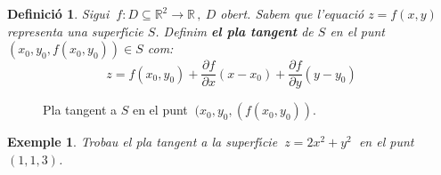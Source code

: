 \documentclass[12pt]{article}
\newcommand{\solucio}{\textbf{Soluci{\'o}}\ \ }
\newtheorem{definicio}{Definici{\'o}}[subsection]
\newtheorem{exemple}{Exemple}[subsection]
\newcommand{\R}{\mathbb{R}}
\begin{document}
%
%


\vspace{0.4cm}
\begin{definicio}
Sigui  $\ f:D  \subseteq \R^2\longrightarrow \R\,, \ D$  obert. Sabem que l'equaci{\'o} $z=f(x,y)$ representa una superf{\'\i}cie $S$. Definim  \textbf{el pla tangent} de $S$ en el punt $(x_0,y_0,f(x_0,y_0))\in S$ com:
$$z=f(x_0,y_0)+\frac{\partial f}{\partial x}(x-x_0)+\frac{\partial f}{\partial y}(y-y_0)$$
\end{definicio}


\vspace{0.4cm}
\begin{figure}[h]
\begin{center}

\end{center}\caption{Pla tangent a $S$ en el punt $\ (x_0,y_0,(f(x_0,y_0))$.}\label{dfdv3}
\end{figure}

\vspace{0.4cm}
\begin{exemple}
Trobau el pla tangent a la superf{\'\i}cie $\ z=2x^{2}+y^{2}\ $ en el punt $(1,1,3)$.
\end{exemple}
\end{document}
